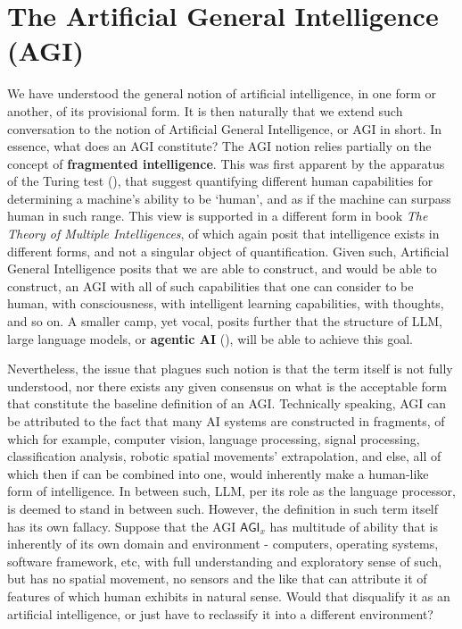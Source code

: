 \section{The Artificial General Intelligence (AGI)}
We have understood the general notion of artificial intelligence, in one form or another, of its provisional form. It is then naturally that we extend such conversation to the notion of Artificial General Intelligence, or AGI in short. In essence, what does an AGI constitute? The AGI notion relies partially on the concept of \textbf{fragmented intelligence}. This was first apparent by the apparatus of the Turing test (\cite{turing1950computing}), that suggest quantifying different human capabilities for determining a machine's ability to be `human', and as if the machine can surpass human in such range. This view is supported in a different form in \cite{gardner1983frames} book \textit{The Theory of Multiple Intelligences}, of which again posit that intelligence exists in different forms, and not a singular object of quantification. Given such, Artificial General Intelligence posits that we are able to construct, and would be able to construct, an AGI with all of such capabilities that one can consider to be human, with consciousness, with intelligent learning capabilities, with thoughts, and so on. A smaller camp, yet vocal, posits further that the structure of LLM, large language models, or \textbf{agentic AI} (\cite{sapkota2025agentic,derouiche2025agentic,schneider2025generative,wei2025agentic,raza2025trism}), will be able to achieve this goal. 

Nevertheless, the issue that plagues such notion is that the term itself is not fully understood, nor there exists any given consensus on what is the acceptable form that constitute the baseline definition of an AGI. Technically speaking, AGI can be attributed to the fact that many AI systems are constructed in fragments, of which for example, computer vision, language processing, signal processing, classification analysis, robotic spatial movements' extrapolation, and else, all of which then if can be combined into one, would inherently make a human-like form of intelligence. In between such, LLM, per its role as the language processor, is deemed to stand in between such. However, the definition in such term itself has its own fallacy. Suppose that the AGI $\mathsf{AGI}_{x}$ has multitude of ability that is inherently of its own domain and environment - computers, operating systems, software framework, etc, with full understanding and exploratory sense of such, but has no spatial movement, no sensors and the like that can attribute it of features of which human exhibits in natural sense. Would that disqualify it as an artificial intelligence, or just have to reclassify it into a different environment?

